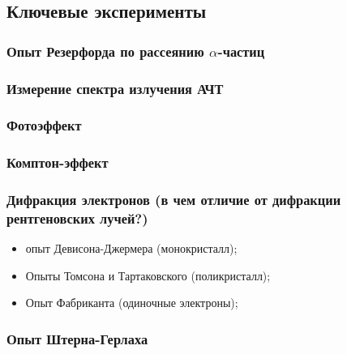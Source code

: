 \subsection{Ключевые эксперименты}

\subsubsection{Опыт Резерфорда по рассеянию $\alpha$-частиц}

\subsubsection{Измерение спектра излучения АЧТ}

\subsubsection{Фотоэффект}

\subsubsection{Комптон-эффект}

\subsubsection{Дифракция электронов (в чем отличие от дифракции рентгеновских лучей?)}
\begin{itemize}
  \item опыт Девисона-Джермера (монокристалл);
  \item Опыты Томсона  и Тартаковского (поликристалл);
  \item Опыт Фабриканта (одиночные электроны);
\end{itemize}

\subsubsection{Опыт Штерна-Герлаха}
